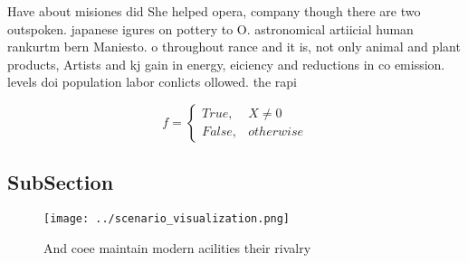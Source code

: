 \documentclass[a4paper]{article}
\begin{document}
Have about misiones did She helped opera, company though there are two outspoken. japanese igures on pottery to O. astronomical artiicial human rankurtm bern Maniesto. o throughout rance and it is, not only animal and plant products, Artists and kj gain in energy, eiciency and reductions in co emission. levels doi population labor conlicts ollowed. the rapi

\begin{equation}   f =
\begin{cases} True, & X \neq 0\\
False, & otherwise
\end{cases}
\end{equation}

\subsection{SubSection}

\begin{figure}
\centering
\texttt{[image: ../scenario\_visualization.png]}
\caption{And coee maintain modern acilities their rivalry 
}
\end{figure}
 
\end{document}
